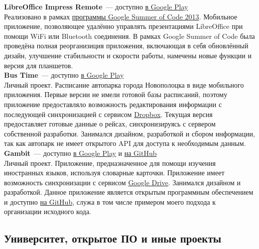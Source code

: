       \textbf{LibreOffice Impress Remote}~--- доступно \href{https://play.google.com/store/apps/details?id=org.libreoffice.impressremote}{в Google Play} \\

        Реализовано в рамках \href{https://developers.google.com/open-source/soc}{программы Google Summer of Code 2013}.
        Мобильное приложение, позволяющее удалённо управлять презентациями
        LibreOffice при помощи WiFi или Bluetooth соединения. В рамках
        Google Summer of Code была проведёна полная реорганизиция приложения,
        включающая в себя обновлённый дизайн,
        улучшение стабильности и скорости работы, намечены новые
        функции и версия для планшетов. \\

      \textbf{Bus Time}~--- доступно \href{https://play.google.com/store/apps/details?id=ru.ming13.bustime}{в Google Play} \\

        Личный проект. Расписание автопарка города Новополоцка в виде мобильного приложения.
        Первые версии не имели готовой базы расписаний, поэтому приложение
        предоставляло возможность редактирования информации с последующей синхронизацией
        с сервисом \href{https://dropbox.com}{Dropbox}. Текущая версия
        предоставляет готовые данные о рейсах, синхронизируясь
        с сервером собственной разработки. Занимался дизайном, разработкой
        и сбором информации, так как автопарк не имеет открытого API для доступа
        к необходимым данным. \\

      \textbf{Gambit}~--- доступно \href{https://play.google.com/store/apps/details?id=ru.ming13.gambit}{в Google Play}
        и \href{https://github.com/ming13/gambit}{на GitHub} \\

        Личный проект. Приложение, предназначенное для помощи изучения иностранных языков,
        используя словарные карточки. Приложение имеет возможность
        синхронизации с сервисом \href{https://drive.google.com}{Google Drive}.
        Занимался дизайном
        и разработкой. Данное приложение является открытым программным обеспечением
        и доступно \href{https://github.com/ming13/gambit}{на GitHub},
        служа в том числе примером моего подхода к организации исходного кода.

    \subsection*{Университет, открытое ПО и иные проекты}

